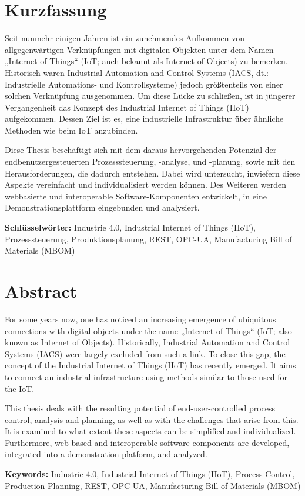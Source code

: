 \hfill
\section*{Kurzfassung}
Seit nunmehr einigen Jahren ist ein zunehmendes Aufkommen von allgegenwärtigen Verknüpfungen mit digitalen Objekten unter dem Namen „Internet of Things“ (IoT; auch bekannt als Internet of Objects) zu bemerken. Historisch waren Industrial Automation and Control Systems (IACS, dt.: Industrielle Automations- und Kontrollsysteme) jedoch größtenteils von einer solchen Verknüpfung ausgenommen. Um diese Lücke zu schließen, ist in jüngerer Vergangenheit das Konzept des Industrial Internet of Things (IIoT) aufgekommen. Dessen Ziel ist es, eine industrielle Infrastruktur über ähnliche Methoden wie beim IoT anzubinden.

Diese Thesis beschäftigt sich mit dem daraus hervorgehenden Potenzial der endbenutzergesteuerten Prozesssteuerung, -analyse, und -planung, sowie mit den Herausforderungen, die dadurch entstehen. Dabei wird untersucht, inwiefern diese Aspekte vereinfacht und individualisiert werden können. Des Weiteren werden webbasierte und interoperable Software-Komponenten entwickelt, in eine Demonstrationsplattform eingebunden und analysiert.

\textbf{Schlüsselwörter:} Industrie 4.0, Industrial Internet of Things (IIoT), Prozesssteuerung, Produktionsplanung, REST, OPC-UA, Manufacturing Bill of Materials (MBOM)

\newpage
\hfill

\section*{Abstract}
For some years now, one has noticed an increasing emergence of ubiquitous connections with digital objects under the name „Internet of Things“ (IoT; also known as Internet of Objects). Historically, Industrial Automation and Control Systems (IACS) were largely excluded from such a link. To close this gap, the concept of the Industrial Internet of Things (IIoT) has recently emerged. It aims to connect an industrial infrastructure using methods similar to those used for the IoT.

This thesis deals with the resulting potential of end-user-controlled process control, analysis and planning, as well as with the challenges that arise from this. It is examined to what extent these aspects can be simplified and individualized. Furthermore, web-based and interoperable software components are developed, integrated into a demonstration platform, and analyzed.

\textbf{Keywords:} Industrie 4.0, Industrial Internet of Things (IIoT), Process Control, Production Planning, REST, OPC-UA, Manufacturing Bill of Materials (MBOM)
